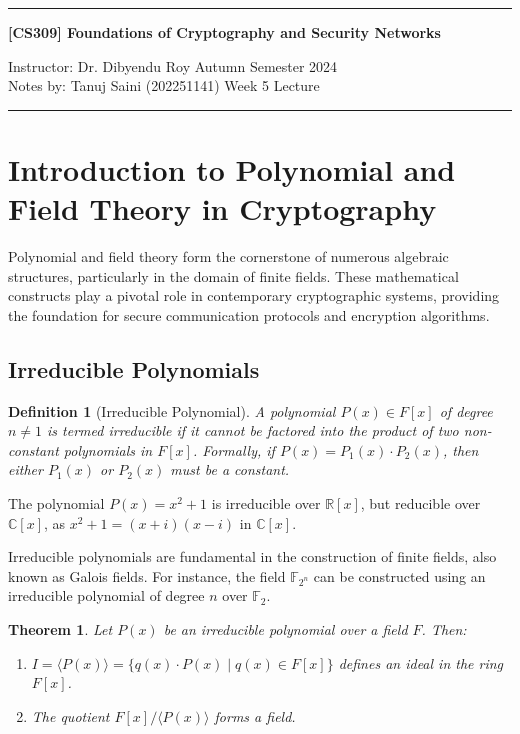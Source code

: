 \documentclass[11pt]{article}
\newtheorem{theorem}{Theorem}
\newtheorem{definition}{Definition}
\begin{document}
\noindent
\rule{\textwidth}{1pt}
\begin{center}
{\bf [CS309] Foundations of Cryptography and Security Networks}
\end{center}
Instructor: Dr. Dibyendu Roy \hfill Autumn Semester 2024\\
Notes by: Tanuj Saini (202251141) \hfill Week 5 Lecture
\\
\rule{\textwidth}{1pt}



\section{Introduction to Polynomial and Field Theory in Cryptography}

Polynomial and field theory form the cornerstone of numerous algebraic structures, particularly in the domain of finite fields. These mathematical constructs play a pivotal role in contemporary cryptographic systems, providing the foundation for secure communication protocols and encryption algorithms.

\subsection{Irreducible Polynomials}

\begin{definition}[Irreducible Polynomial]
A polynomial $P(x) \in F[x]$ of degree $n \neq 1$ is termed irreducible if it cannot be factored into the product of two non-constant polynomials in $F[x]$. Formally, if $P(x) = P_1(x) \cdot P_2(x)$, then either $P_1(x)$ or $P_2(x)$ must be a constant.
\end{definition}

\begin{example}
The polynomial $P(x) = x^2 + 1$ is irreducible over $\mathbb{R}[x]$, but reducible over $\mathbb{C}[x]$, as $x^2 + 1 = (x + i)(x - i)$ in $\mathbb{C}[x]$.
\end{example}

Irreducible polynomials are fundamental in the construction of finite fields, also known as Galois fields. For instance, the field $\mathbb{F}_{2^n}$ can be constructed using an irreducible polynomial of degree $n$ over $\mathbb{F}_2$.

\begin{theorem}
Let $P(x)$ be an irreducible polynomial over a field $F$. Then:
\begin{enumerate}
    \item $I = \langle P(x) \rangle = \{q(x) \cdot P(x) \mid q(x) \in F[x]\}$ defines an ideal in the ring $F[x]$.
    \item The quotient $F[x]/\langle P(x) \rangle$ forms a field.
\end{enumerate}
\end{theorem}
\end{document}
